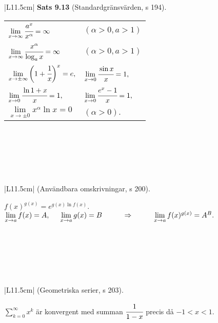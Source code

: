 \documentclass[a4paper]{article}
\begin{document}
\begin{tabular}{|L{11.5cm}|} \hline
\textbf{Sats 9.13} (Standardgränsvärden, s 194). 
\begin{center}
\begin{tabular}{ll}
\vspace{0.05cm}
$\lim\limits_{x\rightarrow \infty} \cfrac{a^x}{x^{\alpha}} = \infty$ & $(\alpha> 0,a>1)$ \\ 
\vspace{0.1cm}
$\lim\limits_{x\rightarrow \infty} \cfrac{x^{\alpha}}{\log_a x} = \infty$ & $(\alpha> 0,a>1)$\\
\vspace{0.05cm}
$\lim\limits_{x\rightarrow \pm \infty} \bigg( 1 + \cfrac{1}{x} \bigg) ^x = e,$ & $\lim\limits_{x\rightarrow 0} \cfrac{\sin x}{x} = 1,$\\
\vspace{0.05cm}
$\lim\limits_{x\rightarrow 0} \cfrac{\ln{1+x}}{x} = 1,$ & $\lim\limits_{x\rightarrow 0} \cfrac{e^x-1}{x} = 1,$ \\
$\lim\limits_{x\rightarrow \pm 0} x^{\alpha}\ln{x} = 0$ & $(\alpha>0).$ \\
\end{tabular}
\end{center}
\\\hline
\end{tabular}
\\\\\\
\begin{tabular}{|L{11.5cm}|} \hline
(Användbara omskrivningar, s 200).
\begin{center}
$f(x)^{g(x)}=e^{g(x)\ln{f(x)}}.$ \\
\vspace{0.2cm}
$\lim\limits_{x\rightarrow a} f(x)=A, \hspace{0.5cm} \lim\limits_{x\rightarrow a} g(x)=B \hspace{1cm} \Rightarrow \hspace{1cm} \lim\limits_{x\rightarrow a} f(x)^{g(x)}=A^B.$
\end{center}
\\\hline
\end{tabular}
\\\\\\
\begin{tabular}{|L{11.5cm}|} \hline
(Geometriska serier, s 203).
\begin{center}
$\sum_{k=0}^{\infty}x^k$ är konvergent med summan $\cfrac{1}{1-x}$ precis då $-1<x<1.$
\end{center}
\\\hline
\end{tabular}
\end{document}
